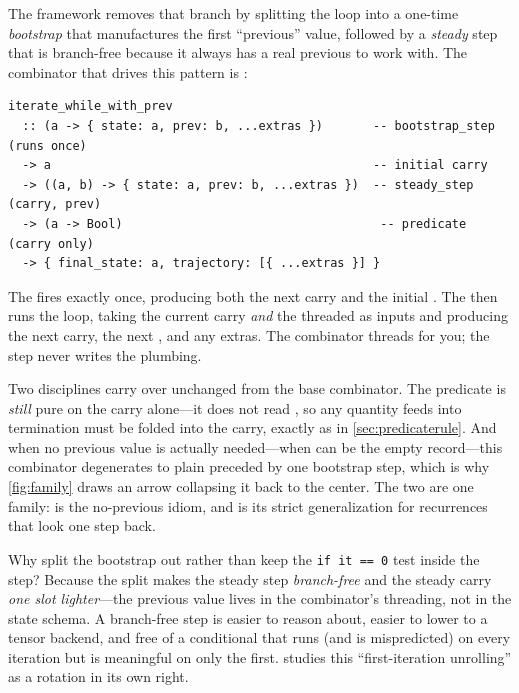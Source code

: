 The framework removes that branch by splitting the loop into a one-time
\emph{bootstrap} that manufactures the first ``previous'' value, followed by a
\emph{steady} step that is branch-free because it always has a real previous to
work with. The combinator that drives this pattern is
:
\begin{lstlisting}[style=l4style]
iterate_while_with_prev
  :: (a -> { state: a, prev: b, ...extras })       -- bootstrap_step (runs once)
  -> a                                             -- initial carry
  -> ((a, b) -> { state: a, prev: b, ...extras })  -- steady_step (carry, prev)
  -> (a -> Bool)                                    -- predicate (carry only)
  -> { final_state: a, trajectory: [{ ...extras }] }
\end{lstlisting}
The  fires exactly once, producing both the next carry and
the initial . The  then runs the loop, taking the
current carry \emph{and} the threaded  as inputs and producing the
next carry, the next , and any extras. The combinator threads
 for you; the step never writes the plumbing.

Two disciplines carry over unchanged from the base combinator. The predicate is
\emph{still} pure on the carry alone---it does not read , so any
quantity  feeds into termination must be folded into the carry, exactly
as in \cref{sec:predicaterule}. And when no previous value is actually
needed---when  can be the empty record---this combinator degenerates
to plain  preceded by one bootstrap step, which is why
\cref{fig:family} draws an arrow collapsing it back to the center. The two are one
family:  is the no-previous idiom, and
 is its strict generalization for recurrences
that look one step back.

\begin{remark}
Why split the bootstrap out rather than keep the \lstinline[style=l4style]|if it == 0|
test inside the step? Because the split makes the steady step \emph{branch-free}
and the steady carry \emph{one slot lighter}---the previous value lives in the
combinator's threading, not in the state schema. A branch-free step is easier to
reason about, easier to lower to a tensor backend, and free of a conditional that
runs (and is mispredicted) on every iteration but is meaningful on only the
first.  studies this ``first-iteration unrolling'' as a
rotation in its own right.
\end{remark}

